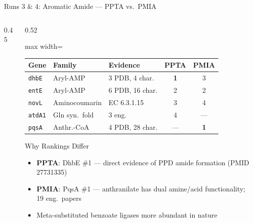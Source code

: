 \documentclass[aspectratio=169, 11pt]{beamer}
\begin{document}
\begin{frame}{Runs 3 \& 4: Aromatic Amide --- PPTA vs.\ PMIA}
\begin{columns}[T]
\begin{column}{0.45\textwidth}
\begin{center}
\end{center}

\end{column}
\begin{column}{0.52\textwidth}

{\scriptsize
\begin{adjustbox}{max width=\textwidth}
\begin{tabular}{@{}l l l c c@{}}
\toprule
\textbf{Gene} & \textbf{Family} & \textbf{Evidence} & \textbf{PPTA} & \textbf{PMIA}\\
\midrule
\texttt{dhbE} & Aryl-AMP & 3 PDB, 4 char. & \textbf{1} & 3\\
\texttt{entE} & Aryl-AMP & 6 PDB, 16 char. & 2 & 2\\
\texttt{novL} & Aminocoumarin & EC 6.3.1.15 & 3 & 4\\
\texttt{atdA1} & Gln syn.\ fold & 3 eng. & 4 & ---\\
\texttt{pqsA} & Anthr.-CoA & 4 PDB, 28 char. & --- & \textbf{1}\\
\bottomrule
\end{tabular}
\end{adjustbox}
}

\vspace{6pt}
\begin{exampleblock}{\scriptsize Why Rankings Differ}
\vspace{-2pt}
\begin{itemize}\scriptsize
\setlength\itemsep{1pt}
\item \textbf{PPTA}: DhbE \#1 --- direct evidence of PPD amide formation (PMID 27731335)
\item \textbf{PMIA}: PqsA \#1 --- anthranilate has dual amine/acid functionality; 19 eng.\ papers
\item Meta-substituted benzoate ligases more abundant in nature
\end{itemize}
\end{exampleblock}
\end{column}
\end{columns}
\end{frame}
\end{document}
